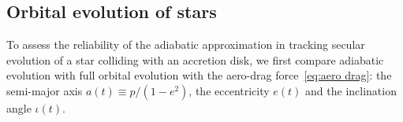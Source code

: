 \documentclass[aps,prx,reprint,superscriptaddress,nofootinbib,longbibliography]{revtex4-1}
\begin{document}




\subsection{Orbital evolution of stars}\label{sec:aerodynamic}
To assess the reliability of the adiabatic approximation in tracking secular evolution of a star colliding with an accretion disk, we first 
compare adiabatic evolution with full orbital evolution with the aero-drag force~\eqref{eq:aero drag}: the semi-major axis $a(t)\equiv p/(1-e^2)$, the eccentricity $e(t)$ and the inclination angle $\iota(t)$.  

\end{document}
